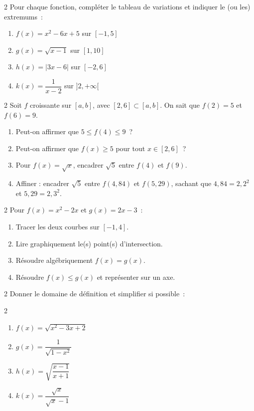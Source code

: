 \begin{exo}{2}
Pour chaque fonction, compl\'eter le tableau de variations et indiquer
le (ou les) extremums~:
\begin{enumerate}
  \item $f(x)=x^2-6x+5$ sur $[-1,5]$
  \item $g(x)=\sqrt{x-1}$ sur $[1,10]$
  \item $h(x)=|3x-6|$ sur $[-2,6]$
  \item $k(x)=\dfrac{1}{x-2}$ sur $]2,+\infty[$
\end{enumerate}
\end{exo}

\begin{exo}{2}
Soit $f$ croissante sur $[a,b]$, avec $[2,6]\subset[a,b]$. On sait que $f(2)=5$ et $f(6)=9$.
\begin{enumerate}
  \item Peut-on affirmer que $5 \leq f(4) \leq 9$~?
  \item Peut-on affirmer que $f(x) \geq 5$ pour tout $x\in[2,6]$~?
  \item Pour $f(x)=\sqrt{x}$, encadrer $\sqrt{5}$ entre $f(4)$ et $f(9)$.
  \item Affiner : encadrer $\sqrt5$ entre $f(4{,}84)$ et $f(5{,}29)$,
        sachant que $4{,}84=2{,}2^2$ et $5{,}29=2{,}3^2$.
\end{enumerate}
\end{exo}

\begin{exo}{2}
Pour $f(x)=x^2-2x$ et $g(x)=2x-3$~:
\begin{enumerate}
  \item Tracer les deux courbes sur $[-1,4]$.
  \item Lire graphiquement le(s) point(s) d'intersection.
  \item R\'esoudre alg\'ebriquement $f(x)=g(x)$.
  \item R\'esoudre $f(x)\leq g(x)$ et repr\'esenter sur un axe.
\end{enumerate}
\end{exo}

\begin{exo}{2}
Donner le domaine de d\'efinition et simplifier si possible~:
\begin{multicols}{2}
\begin{enumerate}
  \item $f(x)=\sqrt{x^2-3x+2}$
  \item $g(x)=\dfrac{1}{\sqrt{1-x^2}}$
  \item $h(x)=\sqrt{\dfrac{x-1}{x+1}}$
  \item $k(x)=\dfrac{\sqrt{x}}{\sqrt{x}-1}$
\end{enumerate}
\end{multicols}
\end{exo}


